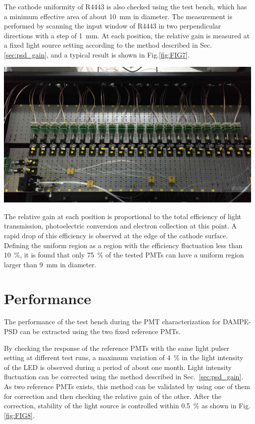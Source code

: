 \documentclass[a4paper,10pt,twoside]{cpc-hepnp}
\begin{document}
\begin{CJK*}{UTF8}{gbsn}
\begin{multicols}{2}
The cathode uniformity of R4443 is also checked using the test bench, which has a minimum effective area of about \SI{10}{\milli\meter} in diameter.
The measurement is performed by scanning the input window of R4443 in two perpendicular directions with a step of \SI{1}{\milli\meter}.
At each position, the relative gain is measured at a fixed light source setting according to the method described in Sec.\ref{sec:psd_gain}, and a typical result is shown in Fig.\ref{fig:FIG7}.

\begin{center}
	\includegraphics[width=\linewidth]{FIG7}
\end{center} 

The relative gain at each position is proportional to the total efficiency of light transmission, photoelectric conversion and electron collection at this point.
A rapid drop of this efficiency is observed at the edge of the cathode surface. 
Defining the uniform region as a region with the efficiency fluctuation less than \SI{10}{\percent}, it is found that only \SI{75}{\percent} of the tested PMTs can have a uniform region larger than \SI{9}{\milli\meter} in diameter. 


\section{Performance}
\label{performance}

The performance of the test bench during the PMT characterization for DAMPE-PSD can be extracted using the two fixed reference PMTs.

By checking the response of the reference PMTs with the same light pulser setting at different test runs, a maximum variation of \SI{4}{\percent} in the light intensity of the LED is observed during a period of about one month.
Light intensity fluctuation can be corrected using the method described in Sec.~\ref{sec:psd_gain}.
As two reference PMTs exists, this method can be validated by using one of them for correction and then checking the relative gain of the other. 
After the correction, stability of the light source is controlled within \textpm\SI{0.5}{\percent} as shown in Fig.\ref{fig:FIG8}.


\end{multicols}
\end{CJK*}
\end{document}
